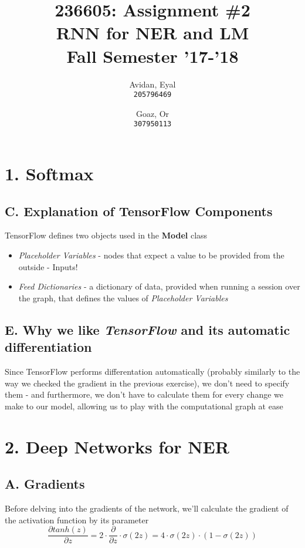 \documentclass{article}
\begin{document}
\title{%
  236605: Assignment \#2 \\
  \large RNN for NER and LM \\
    Fall Semester '17-'18}

\author{
  Avidan, Eyal \\
  \texttt{205796469}
  \and
  Goaz, Or \\
  \texttt{307950113}
}

\maketitle

\section*{1. Softmax}
\subsection*{C. Explanation of TensorFlow Components}
TensorFlow defines two objects used in the \textbf{Model} class
\begin{itemize}
\item \emph{Placeholder Variables} - nodes that expect a value to be provided from the outside - Inputs!
\item \emph{Feed Dictionaries} - a dictionary of data, provided when running a session over the graph, that defines the values of \emph{Placeholder Variables}
\end{itemize}

\subsection*{E. Why we like \emph{TensorFlow} and its automatic differentiation}
Since TensorFlow performs differentation automatically (probably similarly to the way we checked the gradient in the previous exercise), we don't need to specify them - and furthermore, we don't have to calculate them for every change we make to our model, allowing us to play with the computational graph at ease


\section*{2. Deep Networks for \textbf{NER}}
\subsection*{A. Gradients}
Before delving into the gradients of the network, we'll calculate the gradient of the activation function by its parameter
$$
	\frac {\partial tanh(z)} {\partial z} = 2 \cdot \frac {\partial} {\partial z} \cdot \sigma (2z) = 4 \cdot \sigma(2z)\cdot (1- \sigma(2z))
$$
\end{document}
